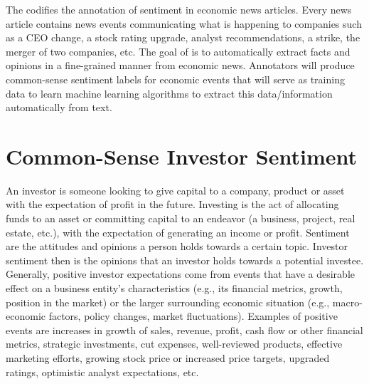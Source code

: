 The \scheme codifies the annotation of sentiment in economic news articles.
Every news article contains news events communicating what is happening to companies such as a CEO change, a stock rating upgrade, analyst recommendations, a strike, the merger of two companies, etc.
The goal of \project is to automatically extract facts and opinions in a fine-grained manner from economic news.
Annotators will produce common-sense sentiment labels for economic events that will serve as training data to learn machine learning algorithms to extract this data/information automatically from text.


\section{Common-Sense Investor Sentiment}
\label{sec:sentimentdef}
An investor is someone looking to give capital to a company, product or asset with the expectation of profit in the future.
Investing is the act of allocating funds to an asset or committing capital to an endeavor (a business, project, real estate, etc.), with the expectation of generating an income or profit.
Sentiment are the attitudes and opinions a person holds towards a certain topic.
Investor sentiment then is the opinions that an investor holds towards a potential investee.
Generally, positive investor expectations come from events that have a desirable effect on a business entity's characteristics (e.g., its financial metrics, growth, position in the market) or the larger surrounding economic situation (e.g., macro-economic factors, policy changes, market fluctuations).
Examples of positive events are increases in growth of sales, revenue, profit, cash flow or other financial metrics, strategic investments, cut expenses, well-reviewed products, effective marketing efforts, growing stock price or increased price targets, upgraded ratings, optimistic analyst expectations, etc.

